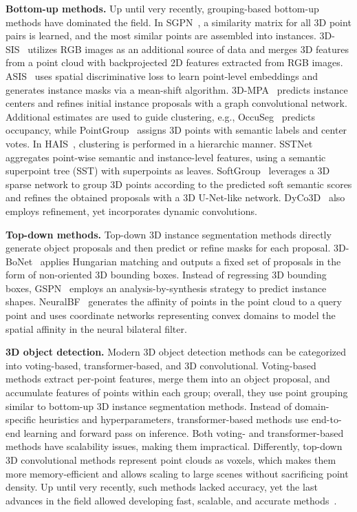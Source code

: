 \documentclass[10pt,twocolumn,letterpaper]{article}
\newcommand\inline{\noindent\textbf}
\begin{document}
\inline{Bottom-up methods.} Up until very recently, grouping-based bottom-up methods have dominated the field. In SGPN~\cite{wang2018sgpn}, a similarity matrix for all 3D point pairs is learned, and the most similar points are assembled into instances. 3D-SIS~\cite{hou2019sis} utilizes RGB images as an additional source of data and merges 3D features from a point cloud with backprojected 2D features extracted from RGB images.
ASIS~\cite{xinlong2019associatively} uses spatial discriminative loss to learn point-level embeddings and generates instance masks via a mean-shift algorithm.
3D-MPA~\cite{engelmann20203dmpa} predicts instance centers and refines initial instance proposals with a graph convolutional network.
Additional estimates are used to guide clustering, e.g., OccuSeg~\cite{han2020occuseg} predicts occupancy, while PointGroup~\cite{jiang2020pointgroup} assigns 3D points with semantic labels and center votes. In HAIS~\cite{chen2021hierarchical}, clustering is performed in a hierarchic manner. SSTNet~\cite{liang2021instance} aggregates point-wise semantic and instance-level features, using a semantic superpoint tree (SST) with superpoints as leaves. SoftGroup~\cite{vu2022softgroup} leverages a 3D sparse network to group 3D points according to the predicted soft semantic scores and refines the obtained proposals with a 3D U-Net-like network. DyCo3D~\cite{he2021dyco3d} also employs refinement, yet incorporates dynamic convolutions. 

\inline{Top-down methods.} Top-down 3D instance segmentation methods directly generate object proposals and then predict or refine masks for each proposal. 3D-BoNet~\cite{yang2019learning} applies Hungarian matching and outputs a fixed set of proposals in the form of non-oriented 3D bounding boxes. Instead of regressing 3D bounding boxes, GSPN~\cite{li2019gspn} employs an analysis-by-synthesis strategy to predict instance shapes. NeuralBF~\cite{sun2022neuralbf} generates the affinity of points in the point cloud to a query point and uses coordinate networks representing convex domains to model the spatial affinity in the neural bilateral filter.

\inline{3D object detection.} Modern 3D object detection methods can be categorized into voting-based, transformer-based, and 3D convolutional. Voting-based methods extract per-point features, merge them into an object proposal, and accumulate features of points within each group; overall, they use point grouping similar to bottom-up 3D instance segmentation methods. Instead of domain-specific heuristics and hyperparameters, transformer-based methods use end-to-end learning and forward pass on inference. Both voting- and transformer-based methods have scalability issues, making them impractical. Differently, top-down 3D convolutional methods represent point clouds as voxels, which makes them more memory-efficient and allows scaling to large scenes without sacrificing point density. Up until very recently, such methods lacked accuracy, yet the last advances in the field allowed developing fast, scalable, and accurate methods~\cite{rukhovich2022fcaf3d}.
\end{document}

